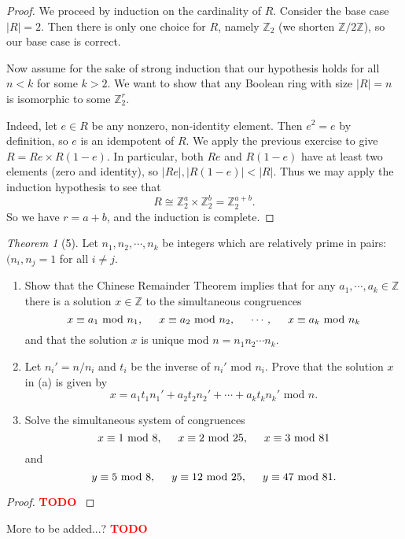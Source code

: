 \documentclass[12pt]{article}
\theoremstyle{remark}
\theoremstyle{named}
\newtheorem*{theorem}{Theorem}
\newcommand{\todo}{\textcolor{red}{\textbf{TODO} }}
\newcommand{\Z}{\mathbb Z}
\renewcommand{\mod}{\text{ mod }}
\begin{document}
\begin{proof}
    We proceed by induction on the cardinality of \(R\). Consider the base case \(|R| = 2\). Then there is only one choice for \(R\), namely \(\Z_2\) (we shorten \(\Z / 2 \Z\)), so our base case is correct. 

    Now assume for the sake of strong induction that our hypothesis holds for all \(n < k\) for some \(k > 2\). We want to show that any Boolean ring with size \(|R| = n\) is isomorphic to some \(\Z_2^r\).

    Indeed, let \(e \in R\) be any nonzero, non-identity element. Then \(e^2 = e\) by definition, so \(e\) is an idempotent of \(R\). We apply the previous exercise to give \(R = Re \times R(1 - e)\). In particular, both \(Re\) and \(R(1 - e)\) have at least two elements (zero and identity), so \(|Re|, |R(1 - e)| < |R|\). Thus we may apply the induction hypothesis to see that \[R \cong \Z_2^a \times \Z_2^b = \Z_2^{a + b}.\]
    So we have \(r = a + b\), and the induction is complete.
\end{proof}

\begin{theorem}[5]
    Let \(n_1, n_2, \cdots, n_k\) be integers which are relatively prime in pairs: \((n_i, n_j = 1\) for all \(i \neq j\). 
    \begin{enumerate}
        \item Show that the Chinese Remainder Theorem implies that for any \(a_1, \cdots, a_k \in \Z\) there is a solution \(x \in \Z\) to the simultaneous congruences
        \[x \equiv a_1 \mod n_1, \hspace*{5mm} x \equiv a_2 \mod n_2, \hspace*{5mm} \cdots, \hspace*{5mm} x \equiv a_k \mod n_k\]
        and that the solution \(x\) is unique mod \(n = n_1n_2\cdots n_k\).
        \item Let \(n_i' = n / n_i\) and \(t_i\) be the inverse of \(n_i' \mod n_i\). Prove that the solution \(x\) in (a) is given by \[x = a_1 t_1 n_1' + a_2 t_2 n_2' + \cdots + a_k t_k n_k' \mod n.\]
        \item Solve the simultaneous system of congruences
        \[x \equiv 1 \mod 8, \hspace*{5mm} x \equiv 2 \mod 25, \hspace*{5mm} x \equiv 3 \mod 81\]
        and \[y \equiv 5 \mod 8, \hspace*{5mm} y \equiv 12 \mod 25, \hspace*{5mm} y \equiv 47 \mod 81.\]
    \end{enumerate}
\end{theorem}

\begin{proof}
    \todo
\end{proof}

More to be added...? \todo
\end{document}
